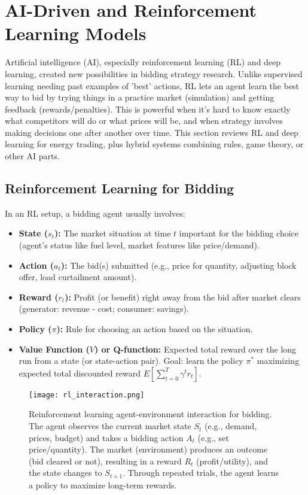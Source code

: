 \documentclass[conference]{IEEEtran}
\begin{document}
\section{AI-Driven and Reinforcement Learning Models}

Artificial intelligence (AI), especially reinforcement learning (RL) and deep learning, created new possibilities in bidding strategy research. Unlike supervised learning needing past examples of 'best' actions, RL lets an agent learn the best way to bid by trying things in a practice market (simulation) and getting feedback (rewards/penalties). This is powerful when it's hard to know exactly what competitors will do or what prices will be, and when strategy involves making decisions one after another over time. This section reviews RL and deep learning for energy trading, plus hybrid systems combining rules, game theory, or other AI parts.

\subsection{Reinforcement Learning for Bidding}

In an RL setup, a bidding agent usually involves:
\begin{itemize}
    \item \textbf{State ($s_t$):} The market situation at time $t$ important for the bidding choice (agent's status like fuel level, market features like price/demand).
    \item \textbf{Action ($a_t$):} The bid(s) submitted (e.g., price for quantity, adjusting block offer, load curtailment amount).
    \item \textbf{Reward ($r_t$):} Profit (or benefit) right away from the bid after market clears (generator: revenue - cost; consumer: savings).
    \item \textbf{Policy ($\pi$):} Rule for choosing an action based on the situation.
    \item \textbf{Value Function ($V$) or Q-function:} Expected total reward over the long run from a state (or state-action pair). Goal: learn the policy $\pi^*$ maximizing expected total discounted reward $E[\sum_{t=0}^T \gamma^t r_t]$.
\end{itemize}

\begin{figure}[ht]
    \centering
    \texttt{[image: rl\_interaction.png]}
    \caption{Reinforcement learning agent-environment interaction for bidding. The agent observes the current market state $S_t$ (e.g., demand, prices, budget) and takes a bidding action $A_t$ (e.g., set price/quantity). The market (environment) produces an outcome (bid cleared or not), resulting in a reward $R_{t}$ (profit/utility), and the state changes to $S_{t+1}$. Through repeated trials, the agent learns a policy to maximize long-term rewards.}
    \label{fig:rl_interaction}
\end{figure}
\end{document}

